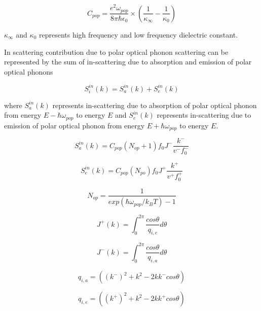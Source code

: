 \documentclass[12pt]{article}
\begin{document}
\begin{equation}
C_{pop} = \frac{e^2 \omega_{pop}}{8 \pi \hbar \epsilon_0} \times \left( \frac{1}{\kappa_{\infty}} - \frac{1}{\kappa_0} \right) 
\label{pop_const}
\end{equation}

$\kappa_{\infty}$ and $\kappa_{0}$ represents high frequency and low frequency dielectric constant.
 
In scattering contribution due to polar optical phonon scattering can be represented by the sum of in-scattering due to absorption and emission of polar optical phonons 

\begin{equation}
S_i^{in}(k) = S_a^{in}(k) + S_e^{in}(k)
\label{in_sc_pop}
\end{equation}

where $S_a^{in}(k)$ represents in-scattering due to absorption of polar optical phonon from energy $E-\hbar \omega_{pop}$ to energy $E$ and $S_e^{in}(k)$ represents in-scattering due to emission of polar optical phonon from energy $E+\hbar \omega_{pop}$ to energy $E$.
   
\begin{equation}
S_{a}^{in}(k) = C_{pop} (N_{op}+1) f_{0}  J^- \frac{k^-}{v ^-f_{0}^-}
\label{ab_in_sc_pop}
\end{equation}

\begin{equation}
S_{e}^{in}(k) = C_{pop} (N_{po}) f_{0}  J^+\frac{k^+}{v^+ f_{0}^+}
\label{ab_in_sc_pop}
\end{equation}


\begin{equation}
N_{op} = \frac{1}{exp(\hbar\omega_{pop}/k_B T) - 1}
\label{N}
\end{equation}

\begin{equation}
J^{+}(k) = \int_0^{2\pi} \frac{cos \theta}{q_{i,e}}  d\theta 
\label{J_plus}
\end{equation}

\begin{equation}
J^{-}(k) = \int_0^{2\pi} \frac{cos \theta}{q_{i,a}} d\theta 
\label{J_plus}
\end{equation}

\begin{equation}
q_{i,a} = \left( \left( k^{-}\right)^2 + k^2 - 2k k^{-} cos \theta \right)
\label{q_ab}
\end{equation}

\begin{equation}
q_{i,e} = \left( \left( k^{+}\right)^2 + k^2  - 2k k^{+} cos \theta \right)
\label{q_em}
\end{equation}
\end{document}
